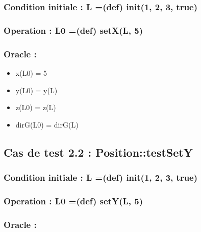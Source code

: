 \documentclass[11pt]{article}
\begin{document}
\subsubsection{Condition initiale : L =(def) init(1, 2, 3, true)}
\label{sec-1.2.1}

\subsubsection{Operation : L0 =(def) setX(L, 5)}
\label{sec-1.2.2}

\subsubsection{Oracle :}
\label{sec-1.2.3}

\begin{itemize}

\item x(L0) = 5\\
\label{sec-1.2.3.1}


\item y(L0) = y(L)\\
\label{sec-1.2.3.2}


\item z(L0) = z(L)\\
\label{sec-1.2.3.3}


\item dirG(L0) = dirG(L)\\
\label{sec-1.2.3.4}


\end{itemize} %
\subsection{Cas de test 2.2 : Position::testSetY}
\label{sec-1.3}

\subsubsection{Condition initiale : L =(def) init(1, 2, 3, true)}
\label{sec-1.3.1}

\subsubsection{Operation : L0 =(def) setY(L, 5)}
\label{sec-1.3.2}

\subsubsection{Oracle :}
\label{sec-1.3.3}
\end{document}

